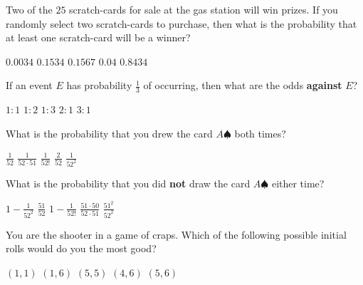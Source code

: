 \documentclass[answers,12pt]{exam}
\begin{document}
\begin{questions}
\question Two of the $25$ scratch-cards for sale at the gas station
will win prizes. If you randomly select two scratch-cards to purchase,
then what is the probability that at least one scratch-card 
will be a winner?\\
\begin{oneparchoices}
\choice $0.0034$ %
\choice $0.1534$ %
\correctchoice $0.1567$
\choice $0.04$ %
\choice $0.8434$ %
\end{oneparchoices}

\question If an event $E$ has probability $\frac{1}{3}$
of occurring, then what are the odds {\bf against} $E$?\\
\begin{oneparchoices}
\choice $1:1$
\choice $1:2$
\choice $1:3$
\correctchoice $2:1$
\choice $3:1$
\end{oneparchoices}


\question\label{FirstDeck} What is the probability that you
drew the card $A\spadesuit$ both times?\\
\begin{oneparchoices}
\choice $\frac{1}{52}$
\choice $\frac{1}{52\cdot 51}$
\choice $\frac{1}{52!}$
\choice $\frac{2}{52}$
\correctchoice $\frac{1}{52^2}$
\end{oneparchoices}

\question\label{LastDeck} What is the probability that you
did {\bf not} draw the card $A\spadesuit$ either time?\\
\begin{oneparchoices}
\choice $1-\frac{1}{52^2}$
\choice $\frac{51}{52}$
\choice $1-\frac{1}{52!}$
\choice $\frac{51\cdot 50}{52\cdot 51}$
\correctchoice $\frac{51^2}{52^2}$
\end{oneparchoices}

\question You are the shooter in a game of craps.
Which of the following possible initial rolls
would do you the most good?\\
\begin{oneparchoices}
\choice $\left(1,1\right)$ %
\correctchoice $\left(1,6\right)$
\choice $\left(5,5\right)$ %
\choice $\left(4,6\right)$
\choice $\left(5,6\right)$ %
\end{oneparchoices}


\end{questions}
\end{document}
